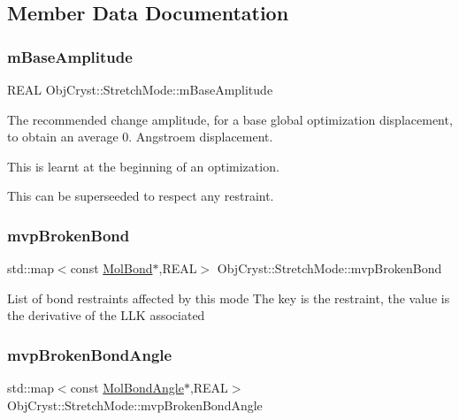 \subsection{Member Data Documentation}
\mbox{\label{struct_obj_cryst_1_1_stretch_mode_aa8dc03e2bd6840d13964dd6751c39fae}} 
\subsubsection{\texorpdfstring{mBaseAmplitude}{mBaseAmplitude}}
{\footnotesize\ttfamily R\+E\+AL Obj\+Cryst\+::\+Stretch\+Mode\+::m\+Base\+Amplitude}

The recommended change amplitude, for a base global optimization displacement, to obtain an average 0. Angstroem displacement.

This is learnt at the beginning of an optimization.

This can be superseeded to respect any restraint. \mbox{\label{struct_obj_cryst_1_1_stretch_mode_a6628812c69f20a7a18a7a3759b5c961c}} 
\subsubsection{\texorpdfstring{mvpBrokenBond}{mvpBrokenBond}}
{\footnotesize\ttfamily std\+::map$<$const \mbox{\hyperlink{class_obj_cryst_1_1_mol_bond}{Mol\+Bond}}$\ast$,R\+E\+AL$>$ Obj\+Cryst\+::\+Stretch\+Mode\+::mvp\+Broken\+Bond}

List of bond restraints affected by this mode The key is the restraint, the value is the derivative of the L\+LK associated \mbox{\label{struct_obj_cryst_1_1_stretch_mode_a2a46f6bd997850be6736e4b5746deeed}} 
\subsubsection{\texorpdfstring{mvpBrokenBondAngle}{mvpBrokenBondAngle}}
{\footnotesize\ttfamily std\+::map$<$const \mbox{\hyperlink{class_obj_cryst_1_1_mol_bond_angle}{Mol\+Bond\+Angle}}$\ast$,R\+E\+AL$>$ Obj\+Cryst\+::\+Stretch\+Mode\+::mvp\+Broken\+Bond\+Angle}

